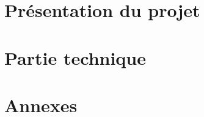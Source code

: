 \documentclass{article}
\begin{document}
	\tableofcontents

	\newpage

	\begin{figure}[p]
		\centering
		\part{Présentation du projet}
	\end{figure}

	\begin{figure}[p]
		\centering
		\part{Partie technique}
	\end{figure}

	\begin{figure}[p]
		\centering
		\part{Annexes}
	\end{figure}

	
\end{document}
